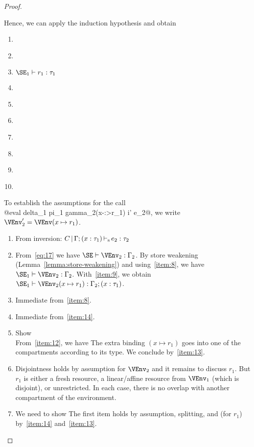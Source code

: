 \begin{proof}
\begin{enumerate}[({A1-}1)]
  \end{enumerate}
  Hence, we can apply the induction hypothesis and obtain
  \begin{enumerate}[({R1-}1)]
  \item {}
  \item\label{item:8} 
  \item\label{item:9} $\SE_1 \vdash r_1 : \tau_1$
  \item\label{item:14} 
  \item\label{item:13} 
  \item\label{item:16} 
  \item\label{item:24} 
  \item\label{item:26} 
  \item\label{item:30} 
  \item\label{item:10} 
  \end{enumerate}
  To establish the assumptions for the call \\
  @eval delta_1 pi_1 gamma_2(x-:>r_1) i' e_2@,
  we write $\VEnv_2' = \VEnv (x \mapsto r_1)$.
  \begin{enumerate}[({A2-}1)]
  \item From inversion: $C \operatorname{|} \Gamma;(x : \tau_1) \operatorname{\vdash_s} e_2 : \tau_2$
  \item From~\eqref{eq:17} we have $\SE \vdash \VEnv_2 : \E_2$.
    By store weakening (Lemma~\ref{lemma:store-weakening}) and
    using~\ref{item:8}, we have
    $\SE_1 \vdash \VEnv_2 : \E_2$.
    With~\ref{item:9}, we obtain
    $\SE_1 \vdash \VEnv_2 (x \mapsto r_1 ) : \E_2;\bvar x {\tau_1}$.
  \item Immediate from~\ref{item:8}.
  \item Immediate from~\ref{item:14}.
  \item Show \\
    From~\ref{item:12}, we have
    The extra
    binding $(x \mapsto r_1)$ goes into one of the compartments
    according to its type. We conclude by~\ref{item:13}.
  \item Disjointness holds by assumption for $\VEnv_2$ and it remains
    to discuss $r_1$. But $r_1$ is either a fresh resource, a
    linear/affine resource from $\VEnv_1$ (which is disjoint), or
    unrestricted. In each case, there is no overlap with another
    compartment of the environment.
  \item We need to show
    The first item holds by assumption, splitting, and (for $r_1$)
    by~\ref{item:14} and~\ref{item:13}.


\end{enumerate}
\end{proof}
